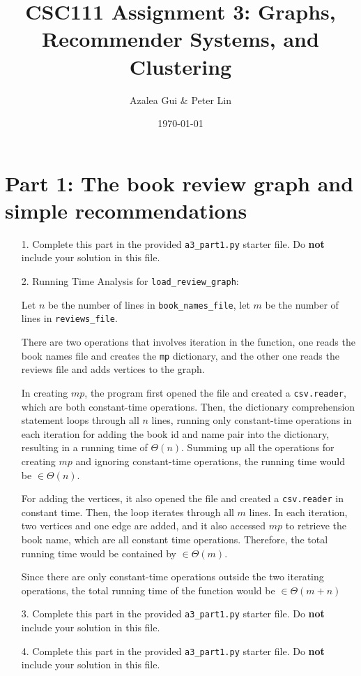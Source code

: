 \documentclass[11pt]{article}
\title{CSC111 Assignment 3: Graphs, Recommender Systems, and Clustering}
\author{Azalea Gui \& Peter Lin}
\date{\today}
\begin{document}
\maketitle

\section*{Part 1: The book review graph and simple recommendations}

\begin{enumerate}

\item[1.]
Complete this part in the provided \texttt{a3\_part1.py} starter file.
Do \textbf{not} include your solution in this file.

\item[2.]
Running Time Analysis for \texttt{load\_review\_graph}:

Let $n$ be the number of lines in \texttt{book\_names\_file}, let $m$ be the number of lines in \texttt{reviews\_file}.

There are two operations that involves iteration in the function, one reads the book names file and creates the \texttt{mp} dictionary, and the other one reads the reviews file and adds vertices to the graph.

In creating $mp$, the program first opened the file and created a \texttt{csv.reader}, which are both constant-time operations. Then, the dictionary comprehension statement loops through all $n$ lines, running only constant-time operations in each iteration for adding the book id and name pair into the dictionary, resulting in a running time of $\Theta(n)$. Summing up all the operations for creating $mp$ and ignoring constant-time operations, the running time would be $\in \Theta(n)$.

For adding the vertices, it also opened the file and created a \texttt{csv.reader} in constant time. Then, the loop iterates through all $m$ lines. In each iteration, two vertices and one edge are added, and it also accessed $mp$ to retrieve the book name, which are all constant time operations. Therefore, the total running time would be contained by $\in \Theta(m)$.

Since there are only constant-time operations outside the two iterating operations, the total running time of the function would be $\in \Theta(m + n)$

\item[3.]
Complete this part in the provided \texttt{a3\_part1.py} starter file.
Do \textbf{not} include your solution in this file.

\item[4.]
Complete this part in the provided \texttt{a3\_part1.py} starter file.
Do \textbf{not} include your solution in this file.

\end{enumerate}
\end{document}
